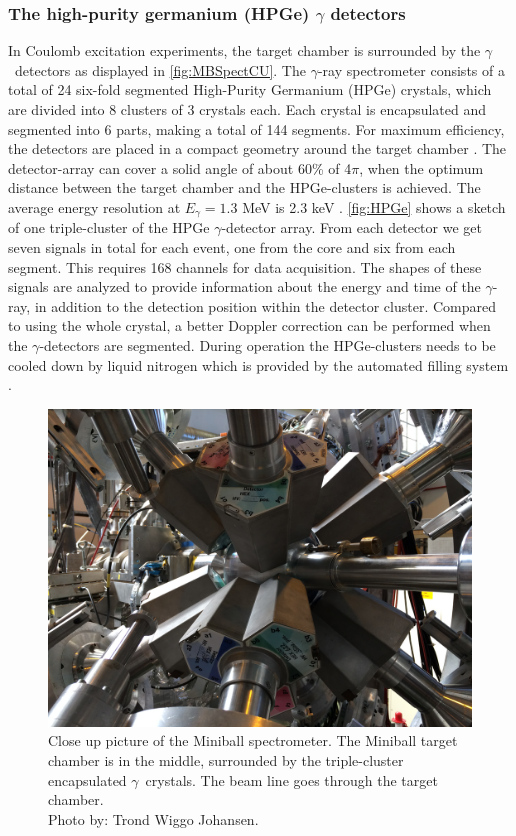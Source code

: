 \documentclass[twoside,english]{uiofysmaster/uiofysmaster}
\newcommand{\ga}{$\gamma$}
\let\orgautoref\autoref
\renewcommand{\autoref}
        {%
		 \def\subsectionautorefname{Section}%
		 \def\subsubsectionautorefname{Section}%
          \orgautoref}
\begin{document}
\subsubsection{The high-purity germanium (HPGe) \texorpdfstring{$\gamma$}{Gamma} detectors}
In Coulomb excitation experiments, the target chamber is surrounded by the \ga\ detectors as displayed in \autoref{fig:MBSpectCU}. The \ga-ray spectrometer consists of a total of 24 six-fold segmented High-Purity Germanium (HPGe) crystals, which are divided into 8 clusters of 3 crystals each. Each crystal is encapsulated and segmented into 6 parts, making a total of 144 segments. For maximum efficiency, the detectors are placed in a compact geometry around the target chamber \cite{NWarr-HPGe, MB-spect}. The detector-array can cover a solid angle of about 60\% of 4$\pi$, when the optimum distance between the target chamber and the HPGe-clusters is achieved. The average energy resolution at $E_\gamma = 1.3$ MeV is 2.3 keV \cite{Butler2017}. 
\autoref{fig:HPGe} shows a sketch of one triple-cluster of the HPGe \ga-detector array.
From each detector we get seven signals in total for each event, one from the core and six from each segment. 
This requires 168 channels for data acquisition. 
The shapes of these signals are analyzed to provide information about the energy and time of the \ga-ray, in addition to the detection position within the detector cluster.
Compared to using the whole crystal, a better Doppler correction can be performed when the \ga-detectors are segmented. 
During operation the HPGe-clusters needs to be cooled down by liquid nitrogen which is provided by the automated filling system \cite{NWarr-HPGe}. 

\begin{figure}[ht]
	\centering
	\includegraphics[width=\linewidth]{Images/IMG3917.JPG}
	\caption{Close up picture of the Miniball spectrometer. The Miniball target chamber is in the middle, surrounded by the triple-cluster encapsulated \ga\ crystals. The beam line goes through the target chamber. \\ Photo by: Trond Wiggo Johansen.}
	\label{fig:MBSpectCU}
\end{figure}
\end{document}
